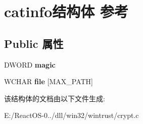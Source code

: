 \hypertarget{structcatinfo}{}\section{catinfo结构体 参考}
\label{structcatinfo}
\subsection*{Public 属性}
\begin{DoxyCompactItemize}
\item 
\mbox{\label{structcatinfo_a8658370ea93710aa13ba5e3e9da384b6}} 
D\+W\+O\+RD {\bfseries magic}
\item 
\mbox{\label{structcatinfo_ab78590aac53a14598e2b1faee57f4e47}} 
W\+C\+H\+AR {\bfseries file} \mbox{[}M\+A\+X\+\_\+\+P\+A\+TH\mbox{]}
\end{DoxyCompactItemize}


该结构体的文档由以下文件生成\+:\begin{DoxyCompactItemize}
\item 
E\+:/\+React\+O\+S-\/0../dll/win32/wintrust/crypt.\+c\end{DoxyCompactItemize}
